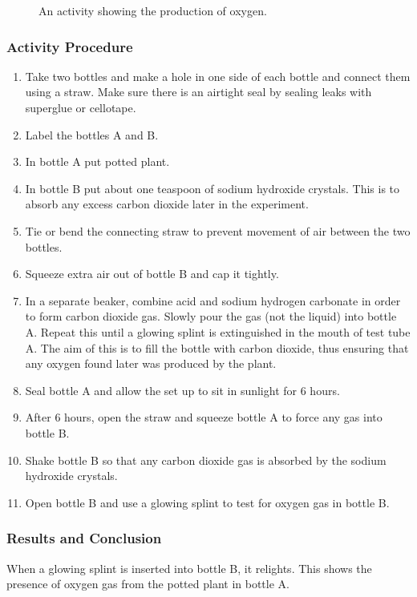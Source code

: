 \begin{figure}[h]
\begin{center}
\def\svgwidth{6cm}

\caption{An activity showing the production of oxygen.}
\label{fig:oxygen}
\end{center}
\end{figure}

\subsubsection*{Activity Procedure}
\begin{enumerate}
\item{Take two bottles and make a hole in one side of each bottle and connect them using a straw. Make sure there is an airtight seal by sealing leaks with superglue or cellotape.}
\item{Label the bottles A and B.}
\item{In bottle A put potted plant.}
\item{In bottle B put about one teaspoon of sodium hydroxide crystals. This is to absorb any excess carbon dioxide later in the experiment.}
\item{Tie or bend the connecting straw to prevent movement of air between the two bottles.}
\item{Squeeze extra air out of bottle B and cap it tightly.}
\item{In a separate beaker, combine acid and sodium hydrogen carbonate in order to form carbon dioxide gas. Slowly pour the gas (not the liquid) into bottle A. Repeat this until a glowing splint is extinguished in the mouth of test tube A. The aim of this is to fill the bottle with carbon dioxide, thus ensuring that any oxygen found later was produced by the plant.}
\item{Seal bottle A and allow the set up to sit in sunlight for 6 hours.}
\item{After 6 hours, open the straw and squeeze bottle A to force any gas into bottle B.}
\item{Shake bottle B so that any carbon dioxide gas is absorbed by the sodium hydroxide crystals.}
\item{Open bottle B and use a glowing splint to test for oxygen gas in bottle B.}
\end{enumerate}

\subsubsection*{Results and Conclusion}
When a glowing splint is inserted into bottle B, it relights. This shows the presence of oxygen gas from the potted plant in bottle A.

